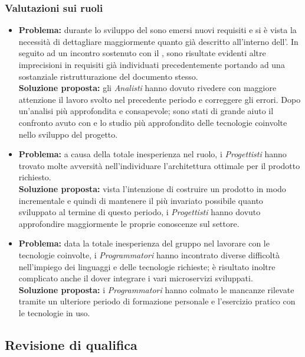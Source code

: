 \subsubsection{Valutazioni sui ruoli}
\begin{itemize}
	\item \textbf{Problema:} durante lo sviluppo del  sono emersi nuovi requisiti e si è vista la necessità di dettagliare maggiormente quanto già descritto all'interno dell'{\AdR}. In seguito ad un incontro sostenuto con il {\CR}, sono risultate evidenti altre imprecisioni in requisiti già individuati precedentemente portando ad una sostanziale ristrutturazione del documento stesso.\\
	\textbf{Soluzione proposta:} gli \textit{Analisti} hanno dovuto rivedere con maggiore attenzione il lavoro svolto nel precedente periodo e correggere gli errori. Dopo un'analisi più approfondita e consapevole; sono stati di grande aiuto il confronto avuto con {\Proponente} e lo studio più approfondito delle tecnologie coinvolte nello sviluppo del progetto.
\end{itemize}
\begin{itemize}
	\item \textbf{Problema:} a causa della totale inesperienza nel ruolo, i \textit{Progettisti} hanno trovato molte avversità nell'individuare l'architettura ottimale per il prodotto richiesto.\\
	\textbf{Soluzione proposta:} vista l'intenzione di costruire un prodotto in modo incrementale e quindi di mantenere il più invariato possibile quanto sviluppato al termine di questo periodo, i \textit{Progettisti} hanno dovuto approfondire maggiormente le proprie conoscenze sul settore.
\end{itemize}
\begin{itemize}
	\item \textbf{Problema:} data la totale inesperienza del gruppo nel lavorare con le tecnologie coinvolte, i \textit{Programmatori} hanno incontrato diverse difficoltà nell'impiego dei linguaggi e delle tecnologie richieste; è risultato inoltre complicato anche il dover integrare i vari microservizi sviluppati.\\
	\textbf{Soluzione proposta:} i \textit{Programmatori} hanno colmato le mancanze rilevate tramite un ulteriore periodo di formazione personale e l'esercizio pratico con le tecnologie in uso.
\end{itemize}
\subsection{Revisione di qualifica} \label{MiglioramentoRQ}
